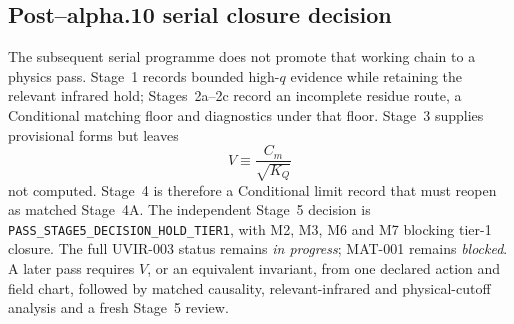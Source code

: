 \subsection{Post--alpha.10 serial closure decision}

The subsequent serial programme does not promote that working chain to a
physics pass.  Stage~1 records bounded high-$q$ evidence while retaining the
relevant infrared hold; Stages~2a--2c record an incomplete residue route, a
Conditional matching floor and diagnostics under that floor.  Stage~3 supplies
provisional forms but leaves
\begin{equation}
 V\equiv\frac{C_m}{\sqrt{K_Q}}
 \label{eq:matched-v-invariant}
\end{equation}
not computed.  Stage~4 is therefore a Conditional limit record that must reopen
as matched Stage~4A.  The independent Stage~5 decision is
\texttt{PASS\_STAGE5\_DECISION\_HOLD\_TIER1}, with M2, M3, M6 and M7 blocking
tier-1 closure.  The full UVIR-003 status remains \emph{in progress}; MAT-001
remains \emph{blocked}.  A later pass requires $V$, or an equivalent invariant,
from one declared action and field chart, followed by matched causality,
relevant-infrared and physical-cutoff analysis and a fresh Stage~5 review.
